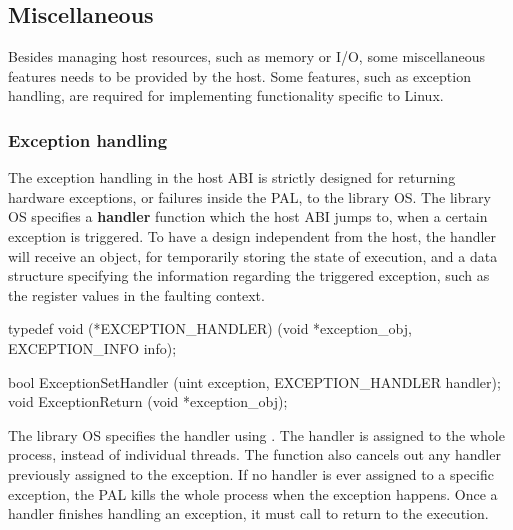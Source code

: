 \subsection{Miscellaneous}
\label{sec:abi:misc}


Besides managing host resources, such as memory or I/O, some miscellaneous features needs to be provided by the host.
Some features, such as exception handling, are required
for implementing functionality specific to Linux.



\subsubsection*{Exception handling}



The exception handling in the host ABI
is strictly designed for returning hardware exceptions,
or failures inside the PAL,
to the library OS.
The library OS specifies a {\bf handler} function which the host ABI
jumps to, when a certain exception is triggered.
To have a design independent from the host,
the handler will receive an object,
for temporarily storing the state of execution,
and a data structure
specifying the information regarding the triggered exception,
such as the register values in the faulting context.





\begin{paldef}
typedef void (*EXCEPTION_HANDLER)
            (void *exception_obj, EXCEPTION_INFO info);

bool ExceptionSetHandler (uint exception,
                          EXCEPTION_HANDLER handler);
void ExceptionReturn     (void *exception_obj);
\end{paldef}

The library OS specifies the handler
using .
The handler is assigned to the whole process,
instead of individual threads.
The function also
cancels out any handler previously assigned to the exception.
If no handler is ever assigned to a specific exception,
the PAL kills the whole process when the exception happens.
Once a handler finishes handling an exception,
it must call  to return to the execution.







